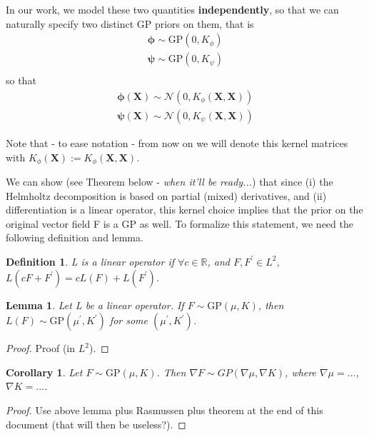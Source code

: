 \documentclass[11pt,a4paper]{article}
\newtheorem{definition}{Definition}
\newtheorem{lemma}{Lemma}
\newtheorem{corollary}{Corollary}
\begin{document}
 
 In our work, we model these two quantities \textbf{independently}, so that we can naturally specify two distinct GP priors on them, that is
\begin{align*}
    \bm{\phi} \sim \text{GP}(0, K_{\phi}) \\
    \bm{\psi} \sim \text{GP}(0,K_{\psi}) \\
\end{align*}
so that 
\begin{align*}
    \bm{\phi}(\textbf{X}) \sim \mathcal{N}(0, K_{\phi}(\textbf{X}, \textbf{X})) \\
    \bm{\psi}(\textbf{X}) \sim \mathcal{N}(0, K_{\psi}(\textbf{X}, \textbf{X}))
\end{align*}


Note that - to ease notation - from now on we will denote this kernel matrices with $K_{\phi}(\textbf{X}) := K_{\phi}(\textbf{X}, \textbf{X})$. \newline

We can show (see Theorem below  - \textit{when it'll be ready...}) that since (i) the Helmholtz decomposition is based on partial (mixed) derivatives, and (ii) differentiation is a linear operator, this kernel choice implies that the prior on the original vector field F is a GP as well. To formalize this statement, we need the following definition and lemma. 

\begin{definition}
L is a linear operator if $\forall c \in \mathbb{R}$, and $F, F^\prime \in L^2$, $L(cF + F^\prime) = c L(F) + L(F^\prime)$.
\end{definition}

\begin{lemma}
Let L be a linear operator. If $F \sim \text{GP} (\mu, K)$, then $L(F) \sim \text{GP}(\mu^\prime, K^\prime)$ for some $(\mu^\prime, K^\prime)$.
\end{lemma}

\begin{proof}
Proof (in $L^2$). 
\end{proof}

\begin{corollary}
Let $F \sim \text{GP}(\mu, K)$. Then $\nabla F \sim GP (\nabla \mu, \nabla K)$, where $\nabla \mu = ...$, $\nabla K = ...$.
\end{corollary}

\begin{proof}
Use above lemma plus Rasmussen plus theorem at the end of this document (that will then be useless?). 
\end{proof}
\end{document}

